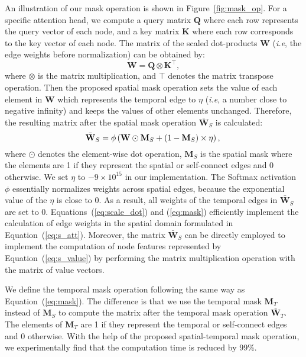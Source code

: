 \documentclass{bmvc2k}
\def\ie{\emph{i.e}\bmvaOneDot}
\begin{document}
An illustration of our mask operation is shown in Figure~\ref{fig:mask_op}. For a specific attention head, we compute a query matrix $\mathbf{Q}$ where each row represents the query vector of each node, and a key matrix $\mathbf{K}$ where each row corresponds to the key vector of each node. The matrix of the scaled dot-products $\mathbf{W}$ (\ie, the edge weights before normalization) can be obtained by:
\begin{equation}
\label{eq:scale_dot}
\mathbf{W} =\mathbf{Q} \otimes \mathbf{K}^{\top},
\end{equation}
where $\otimes$ is the matrix multiplication, and $\top$ denotes the matrix transpose operation. Then the proposed spatial mask operation sets the value of each element in $\mathbf{W}$ which represents the temporal edge to $\eta$ (\ie, a number close to negative infinity) and keeps the values of other elements unchanged. Therefore, the resulting matrix after the spatial mask operation  $\bar{\textbf{W}}_S$ is calculated:
\begin{equation}
\label{eq:mask}
\bar{\mathbf{W}}_S = \phi\left(\mathbf{W} \odot \mathbf{M}_S + \left(1 - \mathbf{M}_S\right) \times \eta\right),\\
\end{equation}
where $\odot$ denotes the element-wise dot operation, $\mathbf{M}_S$ is the spatial mask where the elements are 1 if they represent the spatial or self-connect edges and 0 otherwise. We set $\eta$ to $-9\times10^{15}$ in our implementation. The Softmax activation $\phi$ essentially normalizes weights across spatial edges, because the exponential value of the $\eta$ is close to 0. As a result, all weights of the temporal edges in $\bar{\mathbf{W}}_S$ are set to 0. Equations~(\ref{eq:scale_dot}) and (\ref{eq:mask}) efficiently implement the calculation of edge weights in the spatial domain formulated in Equation~(\ref{eq:s_att}). Moreover, the matrix $\bar{\mathbf{W}}_S$ can be directly employed to implement the computation of node features represented by Equation~(\ref{eq:s_value}) by performing the matrix multiplication operation with the matrix of value vectors. 

We define the temporal mask operation following the same way as Equation~(\ref{eq:mask}). The difference is that we use the temporal mask $\mathbf{M}_T$ instead of $\mathbf{M}_S$ to compute the matrix after the temporal mask operation  $\bar{\mathbf{W}}_T$. The elements of $\mathbf{M}_T$ are 1 if they represent the temporal or self-connect edges and 0 otherwise. With the help of the proposed spatial-temporal mask operation, we experimentally find that the computation time is reduced by 99\%.
%
\end{document}
